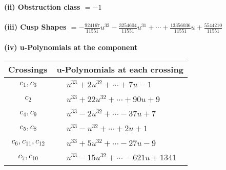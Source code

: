 \documentclass[1p]{elsarticle_modified}
\theoremstyle{definition}
\begin{document}
\flushleft \textbf{(ii) Obstruction class $= -1$}\\~\\
\flushleft \textbf{(iii) Cusp Shapes $= -\frac{924167}{11551} u^{32}-\frac{3254604}{11551} u^{31}+\cdots+\frac{13356036}{11551} u+\frac{5544210}{11551}$}\\~\\
\newpage\renewcommand{\arraystretch}{1}
\flushleft \textbf{(iv) u-Polynomials at the component}\newline \\
\begin{tabular}{m{50pt}|m{274pt}}
Crossings & \hspace{64pt}u-Polynomials at each crossing \\
\hline $$\begin{aligned}c_{1},c_{3}\end{aligned}$$&$\begin{aligned}
&u^{33}+2 u^{32}+\cdots+7 u-1
\end{aligned}$\\
\hline $$\begin{aligned}c_{2}\end{aligned}$$&$\begin{aligned}
&u^{33}+22 u^{32}+\cdots+90 u+9
\end{aligned}$\\
\hline $$\begin{aligned}c_{4},c_{9}\end{aligned}$$&$\begin{aligned}
&u^{33}-2 u^{32}+\cdots-37 u+7
\end{aligned}$\\
\hline $$\begin{aligned}c_{5},c_{8}\end{aligned}$$&$\begin{aligned}
&u^{33}- u^{32}+\cdots+2 u+1
\end{aligned}$\\
\hline $$\begin{aligned}c_{6},c_{11},c_{12}\end{aligned}$$&$\begin{aligned}
&u^{33}+5 u^{32}+\cdots-27 u-9
\end{aligned}$\\
\hline $$\begin{aligned}c_{7},c_{10}\end{aligned}$$&$\begin{aligned}
&u^{33}-15 u^{32}+\cdots-621 u+1341
\end{aligned}$\\
\hline
\end{tabular}\\~\\
\end{document}
